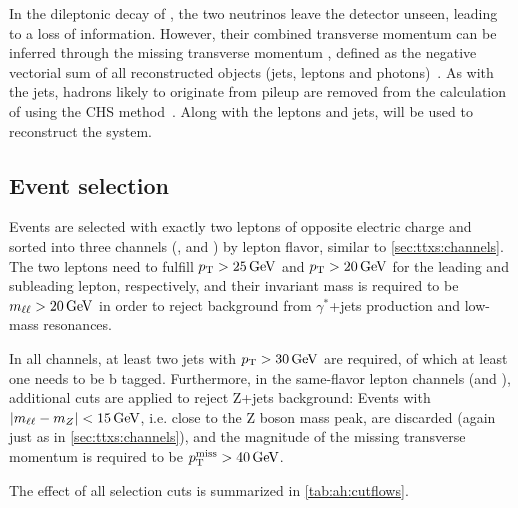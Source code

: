 In the dileptonic decay of \ttbar, the two neutrinos leave the detector unseen, leading to a loss of information. However, their combined transverse momentum can be inferred through the missing transverse momentum \ptmissvec, defined as the negative vectorial sum of all reconstructed objects (jets, leptons and photons)~\cite{CMS:JME-17-001}. As with the jets, hadrons likely to originate from pileup are removed from the calculation of \ptmissvec using the CHS method~\cite{CMS:PRF-14-001}. Along with the leptons and jets, \ptmissvec will be used to reconstruct the \ttbar system.

\subsection{Event selection}

Events are selected with exactly two leptons of opposite electric charge and sorted into three channels (\ee, \emu and \mumu) by lepton flavor, similar to \cref{sec:ttxs:channels}. The two leptons need to fulfill $\pt > \SI{25}{\GeV}$ and $\pt > \SI{20}{\GeV}$ for the leading and subleading lepton, respectively, and their invariant mass is required to be $\mll > \SI{20}{\GeV}$ in order to reject background from $\gamma^*$+jets production and low-mass resonances. 

In all channels, at least two jets with $\pt > \SI{30}{\GeV}$ are required, of which at least one needs to be b tagged. Furthermore, in the same-flavor lepton channels (\ee and \mumu), additional cuts are applied to reject Z+jets background: Events with $|\mll - m_Z| < \SI{15}{\GeV}$, i.e. close to the Z boson mass peak, are discarded (again just as in \cref{sec:ttxs:channels}), and the magnitude of the missing transverse momentum is required to be $\ptmiss > \SI{40}{\GeV}$.

The effect of all selection cuts is summarized in \cref{tab:ah:cutflows}.


